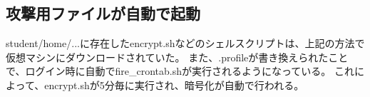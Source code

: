 \documentclass[dvipdfmx,autodetect-engine,titlepage]{jsarticle}
\begin{document}
\subsection{攻撃用ファイルが自動で起動}
student/home/...に存在したencrypt.shなどのシェルスクリプトは、上記の方法で仮想マシンにダウンロードされていた。
また、.profileが書き換えられたことで、ログイン時に自動でfire\_crontab.shが実行されるようになっている。
これによって、encrypt.shが5分毎に実行され、暗号化が自動で行われる。
\end{document}
